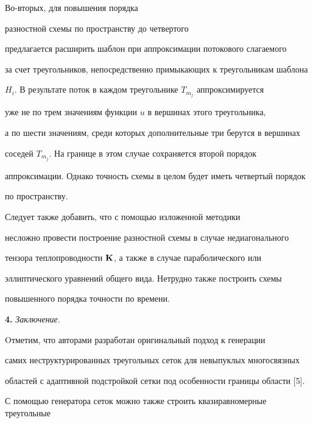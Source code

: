 Во-вторых, для повышения порядка 


разностной схемы по пространству до четвертого


предлагается расширить шаблон при аппроксимации потокового слагаемого


за счет треугольников, непосредственно примыкающих к треугольникам шаблона


$H_i$. В результате поток в каждом треугольнике $T_{m_j}$ аппроксимируется


уже не по трем значениям функции $u$ в вершинах этого треугольника,


а по шести значениям, среди которых дополнительные три берутся в вершинах


соседей $T_{m_j}$. На границе в этом случае сохраняется второй порядок


аппроксимации. Однако точность схемы в целом будет иметь четвертый порядок


по пространству.
















Следует также добавить, что с помощью изложенной методики


несложно провести построение разностной схемы в случае недиагонального


тензора теплопроводности ${\bold K}$, а также в случае параболического или


эллиптического уравнений общего вида. Нетрудно также построить схемы


повышенного порядка точности по времени.





{\bf 4.} {\it Заключение}.


Oтметим, что авторами разработан оригинальный подход к генерации


самих неструктурированных треугольных сеток для невыпуклых многосвязных


областей с адаптивной подстройкой сетки под особенности границы области [5].


С помощью генератора сеток можно также строить квазиравномерные треугольные


